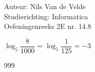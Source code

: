 \documentclass[a4paper]{article}
\begin{document}
  
\noindent \large Auteur: Nils Van de Velde \\
\noindent \large Studierichting: Informatica\\
\noindent \large Oefeningenreeks 2E nr. 14.8\\

\medskip

\normalsize

$\log_5\dfrac{8}{1000} = \log_5\dfrac{1}{125} = -3$\\

\begin{thebibliography}{999}
\end{thebibliography}
\end{document}
